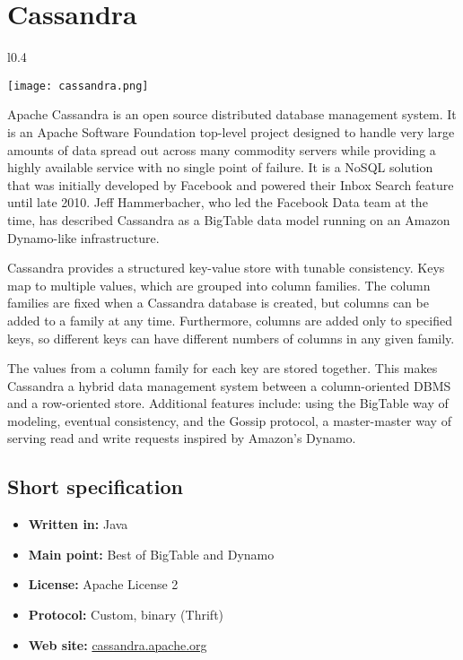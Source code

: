 \chapter{Cassandra}

\begin{wrapfigure}{l}{0.4\textwidth}
  \vspace{-70pt}
  \begin{center}
    \texttt{[image: cassandra.png]}
  \end{center}
  \vspace{-10pt}
\end{wrapfigure}
Apache Cassandra is an open source distributed database management system. It is an Apache Software Foundation top-level project designed to handle very large amounts of data spread out across many commodity servers while providing a highly available service with no single point of failure. It is a NoSQL solution that was initially developed by Facebook and powered their Inbox Search feature until late 2010. Jeff Hammerbacher, who led the Facebook Data team at the time, has described Cassandra as a BigTable data model running on an Amazon Dynamo-like infrastructure.

Cassandra provides a structured key-value store with tunable consistency. Keys map to multiple values, which are grouped into column families. The column families are fixed when a Cassandra database is created, but columns can be added to a family at any time. Furthermore, columns are added only to specified keys, so different keys can have different numbers of columns in any given family.

The values from a column family for each key are stored together. This makes Cassandra a hybrid data management system between a column-oriented DBMS and a row-oriented store. Additional features include: using the BigTable way of modeling, eventual consistency, and the Gossip protocol, a master-master way of serving read and write requests inspired by Amazon's Dynamo.

\section{Short specification}

\begin{itemize}
  \item \textbf{Written in:} Java
  \item \textbf{Main point:} Best of BigTable and Dynamo
  \item \textbf{License:} Apache License 2
  \item \textbf{Protocol:} Custom, binary (Thrift)
  \item \textbf{Web site:} \href{http://cassandra.apache.org/}{cassandra.apache.org}
\end{itemize}

